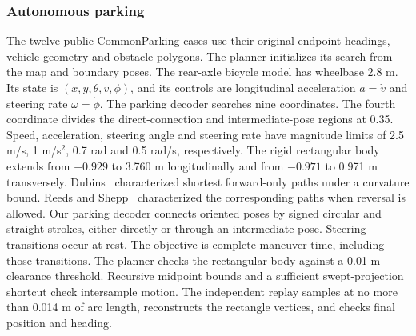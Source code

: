 \subsubsection{Autonomous parking} The twelve public \href{https://github.com/libai1943/CommonParking}{CommonParking} cases use their original endpoint headings, vehicle geometry and obstacle polygons. The planner initializes its search from the map and boundary poses. The rear-axle bicycle model has wheelbase 2.8 m. Its state is $(x,y,\theta,v,\phi)$, and its controls are longitudinal acceleration $a=\dot v$ and steering rate $\omega=\dot\phi$. The parking decoder searches nine coordinates. The fourth coordinate divides the direct-connection and intermediate-pose regions at 0.35. Speed, acceleration, steering angle and steering rate have magnitude limits of 2.5 m/s, 1 m/s$^2$, 0.7 rad and 0.5 rad/s, respectively. The rigid rectangular body extends from $-0.929$ to 3.760 m longitudinally and from $-0.971$ to 0.971 m transversely. Dubins~\cite{dubins} characterized shortest forward-only paths under a curvature bound. Reeds and Shepp~\cite{reeds} characterized the corresponding paths when reversal is allowed. Our parking decoder connects oriented poses by signed circular and straight strokes, either directly or through an intermediate pose. Steering transitions occur at rest. The objective is complete maneuver time, including those transitions. The planner checks the rectangular body against a 0.01-m clearance threshold. Recursive midpoint bounds and a sufficient swept-projection shortcut check intersample motion. The independent replay samples at no more than 0.014 m of arc length, reconstructs the rectangle vertices, and checks final position and heading.

